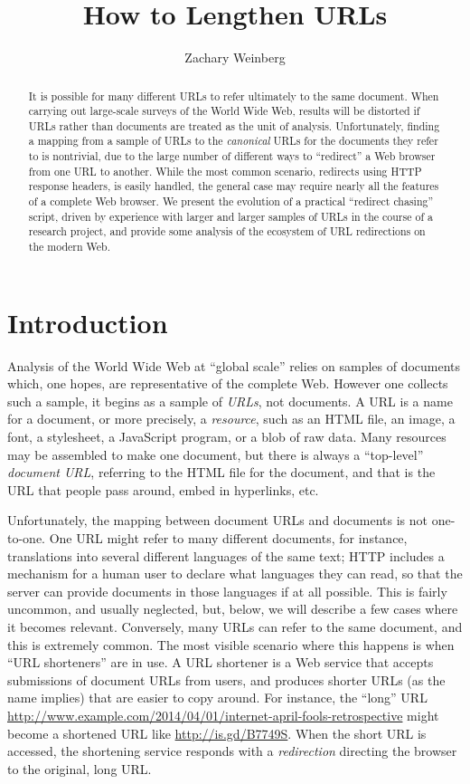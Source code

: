 \documentclass[oneside]{zarticle}
\begin{document}
\title{How to Lengthen URLs}
\author{Zachary Weinberg}
\maketitle

\begin{abstract}
It is possible for many different URLs to refer ultimately to the same
document.  When carrying out large-scale surveys of the World Wide Web,
results will be distorted if URLs rather than documents are treated as
the unit of analysis.  Unfortunately, finding a mapping from a sample
of URLs to the \emph{canonical} URLs for the documents they refer to
is nontrivial, due to the large number of different ways to “redirect”
a Web browser from one URL to another.  While the most common
scenario, redirects using HTTP response headers, is easily handled,
the general case may require nearly all the features of a complete Web
browser.  We present the evolution of a practical “redirect chasing”
script, driven by experience with larger and larger samples of URLs in
the course of a research project, and provide some analysis of the
ecosystem of URL redirections on the modern Web.
\end{abstract}

\section{Introduction}

Analysis of the World Wide Web at “global scale” relies on samples of
documents which, one hopes, are representative of the complete Web.
However one collects such a sample, it begins as a sample of
\emph{URLs}, not documents.  A URL is a name for a document, or more
precisely, a \emph{resource}, such as an HTML file, an image, a font,
a stylesheet, a JavaScript program, or a blob of raw data.  Many
resources may be assembled to make one document, but there is always a
“top-level” \emph{document URL}, referring to the HTML file for the
document, and that is the URL that people pass around, embed in
hyperlinks, etc.

Unfortunately, the mapping between document URLs and documents is not
one-to-one.  One URL might refer to many different documents, for
instance, translations into several different languages of the same
text; HTTP includes a mechanism for a human user to declare what
languages they can read, so that the server can provide documents in
those languages if at all possible.  This is fairly uncommon, and
usually neglected, but, below, we will describe a few cases where it
becomes relevant.  Conversely, many URLs can refer to the same
document, and this is extremely common.  The most visible scenario
where this happens is when “URL shorteners” are in use.  A URL
shortener is a Web service that accepts submissions of document URLs
from users, and produces shorter URLs (as the name implies) that are
easier to copy around.  For instance, the “long” URL
\url{http://www.example.com/2014/04/01/internet-april-fools-retrospective}
might become a shortened URL like \url{http://is.gd/B7749S}.  When the
short URL is accessed, the shortening service responds with a
\emph{redirection} directing the browser to the original, long URL.
\end{document}
